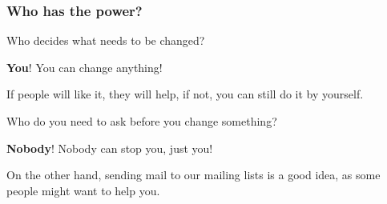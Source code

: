 \documentclass{beamer}
\begin{document}
\begin{frame}[t]
\frametitle{Who has the power?}
Who decides what needs to be changed?
\pause
\vspace{.5cm}

\textbf{You}! You can change anything!
\vspace{.2cm}

{\small If people will like it, they will help, if not, you can still do it by yourself.}
\pause

\vspace{.5cm}

Who do you need to ask before you change something?
\pause
\vspace{.5cm}

\textbf{Nobody}! Nobody can stop you, just you!

\vspace{.2cm}
{\small On the other hand, sending mail to our mailing lists is a good idea, as some people might want to help you.}
\end{frame}

\end{document}
